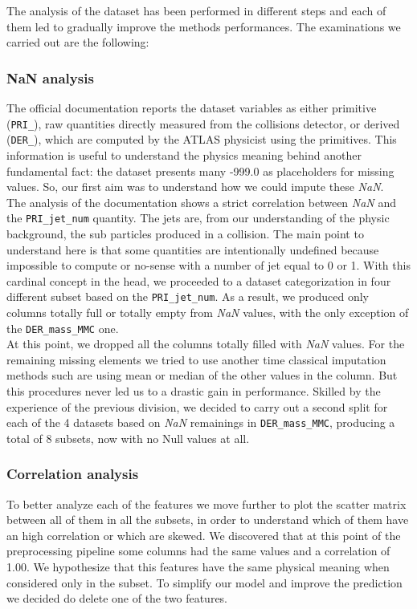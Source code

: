\documentclass[10pt,article]{IEEEtran}
\begin{document}
The analysis of the dataset has been performed in different steps and each of them led to gradually improve the methods performances. The examinations we carried out are the following:
\subsubsection{NaN analysis} The official documentation \cite{higghsdoc} reports the dataset variables as either primitive (\texttt{PRI\_}), raw quantities directly measured from the collisions detector, or derived (\texttt{DER\_}), which are computed by the ATLAS physicist using the primitives. This information is useful to understand the physics meaning behind another fundamental fact: the dataset presents many -999.0 as placeholders for missing values. So, our first aim was to understand how we could impute these \textit{NaN}.\\
The analysis of the documentation shows a strict correlation between \textit{NaN} and the \texttt{PRI\_jet\_num} quantity. The jets are, from our understanding of the physic background, the sub particles produced in a collision. The main point to understand here is that some quantities are intentionally undefined because impossible to compute or no-sense with a number of jet equal to 0 or 1. With this cardinal concept in the head, we proceeded to a dataset categorization in four different subset based on the \texttt{PRI\_jet\_num}. As a result, we produced only columns totally full or totally empty from \textit{NaN} values, with the only exception of the \texttt{DER\_mass\_MMC} one.\\
At this point, we dropped all the columns totally filled with \textit{NaN} values. For the remaining missing elements we tried to use another time classical imputation methods such are using mean or median of the other values in the column. But this procedures never led us to a drastic gain in performance. Skilled by the experience of the previous division, we decided to carry out a second split for each of the 4 datasets based on \textit{NaN} remainings in \texttt{DER\_mass\_MMC}, producing a total of 8 subsets, now with no Null values at all.
\subsubsection{Correlation analysis} To better analyze each of the features we move further to plot the scatter matrix between all of them in all the subsets, in order to understand which of them have an high correlation or which are skewed. We discovered that at this point of the preprocessing pipeline some columns had the same values and a correlation of 1.00. We hypothesize that this features have the same physical meaning when considered only in the subset. To simplify our model and improve the prediction we decided do delete one of the two features.
\end{document}
